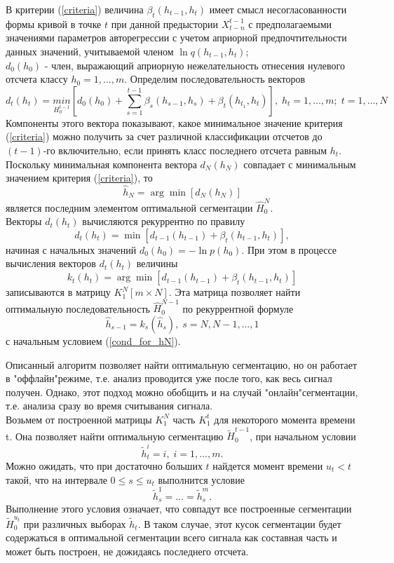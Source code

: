 \documentclass[12pt,a4paper]{article}
\begin{document}
В критерии (\ref{criteria}) величина $\beta_t(h_{t-1},h_t)$ имеет смысл несогласованности формы кривой в точке $t$ при данной предыстории $X_{t-n}^{t-1}$ с предполагаемыми значениями параметров авторегрессии с учетом априорной предпочтительности данных значений, учитываемой членом $\ln q(h_{t-1},h_t)$;\\$d_0(h_0)$ - член, выражающий априорную нежелательность отнесения нулевого отсчета классу $h_0 = 1,\dots,m$.
Определим последовательность векторов
$$d_t(h_t) = \underset{H_0^{t-1}}{min}[d_0(h_0) +\sum_{s=1}^{t-1} \beta_s(h_{s-1},h_s) + \beta_t(h_{t_1},h_t)],\;h_t = 1,\dots,m;\;t = 1,\dots,N$$
Компоненты этого вектора показывают, какое минимальное значение критерия (\ref{criteria}) можно получить за счет различной классификации отсчетов до $(t-1)$-го включительно, если принять класс последнего отсчета равным $h_t$. Поскольку минимальная компонента вектора $d_N(h_N)$ совпадает с минимальным значением критерия (\ref{criteria}), то 
\begin{equation}
\label{cond_for_hN}
\hat{h}_N = \arg\min[d_N(h_N)]
\end{equation}
является последним элементом оптимальной 
сегментации $\hat{H}_0^N$.\\
Векторы $d_t(h_t)$ вычисляются рекуррентно по правилу
$$d_t(h_t) = \min[d_{t-1}(h_{t-1})+\beta_t(h_{t-1},h_t)],$$
начиная с начальных значений $d_0(h_0) = -\ln p(h_0)$.
При этом в процессе вычисления векторов $d_t(h_t)$ величины
$$k_t(h_t) = \arg\min[d_{t-1}(h_{t-1})+\beta_t(h_{t-1},h_t)]$$
записываются в матрицу $K_1^N[m \times N]$. Эта матрица позволяет найти оптимальную последовательность $\hat{H}_0^{N-1}$ по рекуррентной формуле
\begin{equation}
\label{rule_9}
\hat{h}_{s-1} = k_s(\hat{h}_s),\; s = N, N-1, \dots, 1
\end{equation}
с начальным условием (\ref{cond_for_hN}).

Описанный алгоритм позволяет найти оптимальную сегментацию, но он работает в "оффлайн"\space режиме, т.е. анализ проводится уже после того, как весь сигнал получен. Однако, этот подход можно обобщить и на случай "онлайн"\space сегментации, т.е. анализа сразу во время считывания сигнала.\\

Возьмем от построенной матрицы $K_1^N$ часть $K_1^t$ для некоторого момента времени t. Она позволяет найти оптимальную сегментацию $\tilde{H}_0^{t-1}$, при начальном условии
\begin{equation}
\label{vect_11}
\tilde{h}_t^i = i,\; i=1,\dots,m.
\end{equation}
Можно ожидать, что при достаточно больших $t$ найдется момент времени $u_t<t$ такой, что на интервале $0\leq s \leq u_t$ выполнится условие
\begin{equation}
\label{cond_12}
\tilde{h}_s^1 = \dots = \tilde{h}_s^m.
\end{equation}
Выполнение этого условия означает, что совпадут все построенные сегментации $\tilde{H}_0^{u_t}$ при различных выборах $\tilde{h}_t$. В таком случае, этот кусок сегментации будет содержаться в оптимальной сегментации всего сигнала как составная часть и может быть построен, не дожидаясь последнего отсчета.\\
\end{document}
